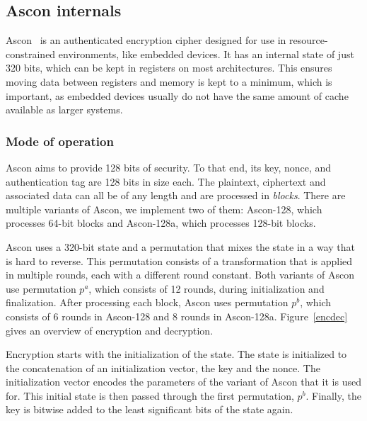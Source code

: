 

\subsection{Ascon internals}

Ascon~\cite{ascon} is an authenticated encryption cipher designed for use in
resource-constrained environments, like embedded devices. It has an internal
state of just 320 bits, which can be kept in registers on most architectures.
This ensures moving data between registers and memory is kept to a minimum,
which is important, as embedded devices usually do not have the same amount of
cache available as larger systems.

\subsubsection{Mode of operation}

Ascon aims to provide 128 bits of security. To that end, its key, nonce, and
authentication tag are 128 bits in size each. The plaintext, ciphertext and
associated data can all be of any length and are processed in \emph{blocks}.
There are multiple variants of Ascon, we implement two of them: Ascon-128, which
processes 64-bit blocks and Ascon-128a, which processes 128-bit blocks.

Ascon uses a 320-bit state and a permutation that mixes the state in a way that
is hard to reverse. This permutation consists of a transformation that is
applied in multiple rounds, each with a different round constant. Both variants
of Ascon use permutation $p^a$, which consists of 12 rounds, during
initialization and finalization. After processing each block, Ascon uses
permutation $p^b$, which consists of 6 rounds in Ascon-128 and 8 rounds in
Ascon-128a. Figure~\ref{encdec} gives an overview of encryption and decryption.



Encryption starts with the initialization of the state. The state is initialized
to the concatenation of an initialization vector, the key and the nonce. The
initialization vector encodes the parameters of the variant of Ascon that it is
used for. This initial state is then passed through the first permutation,
$p^b$. Finally, the key is bitwise added to the least significant bits of the
state again.

